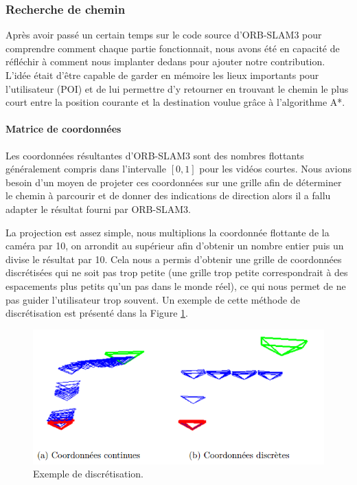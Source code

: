 \documentclass[11pt]{article}
\begin{document}
      \subsubsection{Recherche de chemin}
        Après avoir passé un certain temps sur le code source d'ORB-SLAM3 pour comprendre comment chaque partie fonctionnait, nous avons
        été en capacité de réfléchir à comment nous implanter dedans pour ajouter notre contribution. L'idée était d'être capable de garder
        en mémoire les lieux importants pour l'utilisateur (POI) et de lui permettre d'y retourner en trouvant le chemin le plus court
        entre la position courante et la destination voulue grâce à l'algorithme A*.    

        \paragraph{Matrice de coordonnées}
          Les coordonnées résultantes d'ORB-SLAM3 sont des nombres flottants généralement compris dans l'intervalle $[0,1]$ pour les vidéos
          courtes. Nous avions besoin d'un moyen de projeter ces coordonnées sur une grille afin de déterminer le chemin à parcourir
          et de donner des indications de direction alors il a fallu adapter le résultat fourni par ORB-SLAM3.

         La projection est assez simple, nous multiplions la coordonnée flottante de la caméra par 10, on arrondit au supérieur afin d'obtenir
         un nombre entier puis un divise le résultat par 10. Cela nous a permis d'obtenir une grille de coordonnées discrétisées qui ne soit
         pas trop petite (une grille trop petite correspondrait à des espacements plus petits qu'un pas dans le monde réel), ce qui nous permet
         de ne pas guider l'utilisateur trop souvent. Un exemple de cette méthode de discrétisation est présenté dans la Figure 
         \ref{fig:Coordonnees}.

         \begin{figure}[hbt]  
          \includegraphics[width=\textwidth]{Coordonnees.png}    
          \caption{Exemple de discrétisation.}
          \label{fig:Coordonnees}
        \end{figure}  
\end{document}
